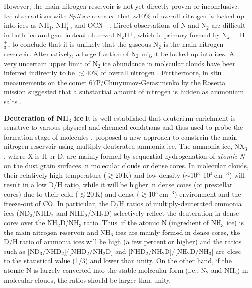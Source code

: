 \documentclass[12pt,a4paper]{article}  %
\newcommand{\ammonia}{NH$_3$\xspace}
\begin{document}
\smallskip
\noindent However, the main nitrogen reservoir is not yet directly proven or inconclusive. Ice observations with \textit{Spitzer} revealed that $\sim$10\% of overall nitrogen is locked up into ices as \ammonia, NH$_4^+$, and OCN$^-$ \citep{Oberg11}. Direct observations of N and N$_2$ are difficult in both ice and gas. \citet{Maret06} instead observed N$_2$H$^+$, which is primary formed by N$_2$ + H$_3^+$, to conclude that it is unlikely that the gaseous N$_2$ is the main nitrogen reservoir. Alternatively, a large fraction of N$_2$ might be locked up into ices. A very uncertain upper limit of N$_2$ ice abundance in molecular clouds have been inferred indirectly to be $\lesssim$40\% of overall nitrogen \citep{Boogert15}. Furthermore, in situ measurements on the comet 67P/Churyumov-Gerasimenko by the Rosetta mission suggested that a substantial amount of nitrogen is hidden as ammonium salts \citep{Altwegg20}.

\medskip
\noindent \textbf{Deuteration of \ammonia ice} \quad  It is well established that deuterium enrichment is sensitive to various physical and chemical conditions and thus used to probe the formation stage of molecules \citep[e.g.,][]{Ceccarelli14}. \citet{Furuya18} proposed a new approach to constrain the main nitrogen reservoir using multiply-deuterated ammonia ice. The ammonia ice, NX$_3$, where X is H or D, are mainly formed by sequential hydrogenation of \textit{atomic N} on the dust grain surfaces in molecular clouds or dense cores. In molecular clouds, their relatively high temperature ($\gtrsim$20\,K) and low density ($\sim$10$^3$--10$^4$\,cm$^{-3}$) will result in a low D/H ratio, while it will be higher in dense cores (or prestellar cores) due to their cold ($\lesssim$20\,K) and dense ($\gtrsim$10$^5$\,cm$^{-3}$) environment and the freeze-out of CO. In particular, the D/H ratios of multiply-deuterated ammonia ices (ND$_3$/NHD$_2$ and NHD$_2$/NH$_2$D) selectively reflect the deuteration in dense cores over the NH$_2$D/NH$_3$ ratio. Thus, if the atomic N (ingredient of \ammonia ice) is the main nitrogen reservoir and \ammonia ices are mainly formed in dense cores, the D/H ratio of ammonia ices will be high (a few percent or higher) and the ratios such as [ND$_3$/NHD$_2$]/[NHD$_2$/NH$_2$D] and [NHD$_2$/NH$_2$D]/[NH$_2$D/NH$_3$] are close to the statistical value (1/3) and lower than unity. On the other hand, if the atomic N is largely converted into the stable molecular form (i.e., N$_2$ and NH$_3$) in molecular clouds, the ratios should be larger than unity. 
\end{document}
